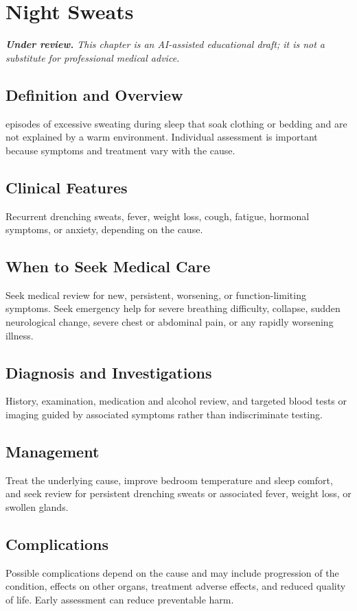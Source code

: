 \chapter{Night Sweats}

\medskip
\noindent\textit{\textbf{Under review.} This chapter is an AI-assisted educational draft; it is not a substitute for professional medical advice.}

\section*{Definition and Overview}
episodes of excessive sweating during sleep that soak clothing or bedding and are not explained by a warm environment. Individual assessment is important because symptoms and treatment vary with the cause.

\section*{Clinical Features}
Recurrent drenching sweats, fever, weight loss, cough, fatigue, hormonal symptoms, or anxiety, depending on the cause.

\section*{When to Seek Medical Care}
Seek medical review for new, persistent, worsening, or function-limiting symptoms. Seek emergency help for severe breathing difficulty, collapse, sudden neurological change, severe chest or abdominal pain, or any rapidly worsening illness.

\section*{Diagnosis and Investigations}
History, examination, medication and alcohol review, and targeted blood tests or imaging guided by associated symptoms rather than indiscriminate testing.

\section*{Management}
Treat the underlying cause, improve bedroom temperature and sleep comfort, and seek review for persistent drenching sweats or associated fever, weight loss, or swollen glands.

\section*{Complications}
Possible complications depend on the cause and may include progression of the condition, effects on other organs, treatment adverse effects, and reduced quality of life. Early assessment can reduce preventable harm.

